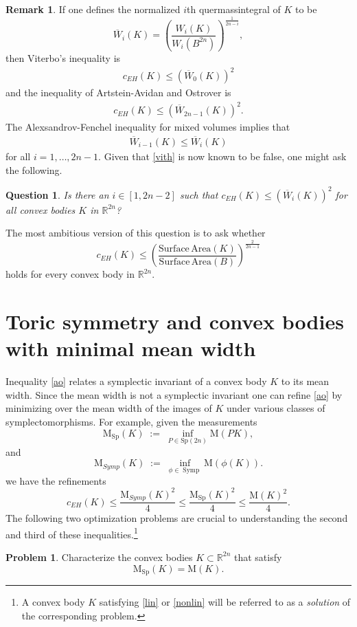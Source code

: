 \documentclass[12pt]{amsart}
\newtheorem{question}[theorem]{Question}
\theoremstyle{definition}
\newtheorem{remark}[theorem]{Remark}
\newtheorem{problem}[theorem]{Problem}
\newcommand{\eqdef}{\;{:=}\;}
\newcommand\Symp{\operatorname{Symp}}
\newcommand{\RR}{{\mathbb R}}
\newcommand{\mw}{{{\mathrm {M}}}}
\newcommand{\lmw}{{\mathrm {M}}_{\mathrm{Sp}}}
\newcommand{\nlmw}{\mathrm{M}_{{Symp}}}
\begin{document}
\begin{remark}\label{qm}
If one defines the normalized $i$th quermassintegral of $K$ to be
$$\overline{W}_i(K)=\left(\frac{W_{i}(K)}{W_{i}(B^{2n})}\right)^{\frac{1}{2n-i}},$$ then Viterbo's inequality is \begin{align}\label{vith}c_{EH}(K) \leq (\overline{W}_0(K))^2\end{align} and the inequality of Artstein-Avidan and Ostrover is \begin{align}\label{aoh}c_{EH}(K) \leq (\overline{W}_{2n-1}(K))^2.\end{align} The Alexsandrov-Fenchel inequality for mixed volumes implies that
\begin{align*}
  \overline{W}_{i-1}(K) \leq \overline{W}_i(K) 
\end{align*}
for all $i=1, \dots,2n-1.$ 
Given that \eqref{vith} is now known to be false, one might ask the following.
\begin{question} Is there an $i \in [1,2n-2]$ such that $c_{EH}(K) \leq (\overline{W}_{i}(K))^2$ for all convex bodies $K$ in $\RR^{2n}$?
\end{question}

The most ambitious version of this question is to ask whether $$c_{EH}(K) \leq \left( \frac{\mathrm{Surface\, Area}(K)}{\mathrm{Surface\, Area}(B)}\right)^{\frac{2}{2n-1}}$$
holds for every convex body in $\RR^{2n}.$



\end{remark}


\section{Toric symmetry and convex bodies with minimal mean width}\label{nontoric}


Inequality \eqref{ao} relates a symplectic invariant of a convex body $K$ to its mean width. Since the mean width is not a symplectic invariant one can refine \eqref{ao} by minimizing over the mean width of the images of $K$ under various classes of symplectomorphisms. For example, given the measurements 
\begin{equation*}
  \lmw(K) \eqdef \inf_{P \in \mathrm{Sp}
(2n)} \mw (PK),
\end{equation*}
and 
\begin{equation*}
 \nlmw(K) \eqdef \inf_{\phi \in \Symp} \mw (\phi (K)).
\end{equation*}
we have the refinements
$$
c_{EH}(K) \leq \frac{\nlmw(K)^2}{4}  \leq \frac{\lmw(K)^2}{4}  \leq \frac{\mw(K)^2}{4}.
$$
The following two optimization problems are crucial to understanding the second and third of these inequalities.\footnote{A convex body $K$ satisfying \eqref{lin} or \eqref{nonlin} will be referred to as a {\em solution} of the corresponding problem.} 
\begin{problem}\label{pr1}
Characterize the convex bodies $K \subset \RR^{2n}$ that satisfy \begin{equation}\label{lin}\lmw(K) = \mw(K).\end{equation}
\end{problem}
 
\end{document}
